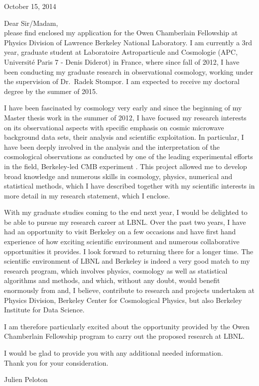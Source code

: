 \documentclass[11pt]{article}
\begin{document}
\thispagestyle{empty}
\thispagestyle{fancy}

\begin{flushright}
October 15, 2014
\end{flushright}

Dear Sir/Madam,
\\

please find enclosed my application for the Owen Chamberlain Fellowship at  Physics Division of Lawrence Berkeley National Laboratory. I am currently a 3rd year, graduate student  at Laboratoire Astroparticule and Cosmologie (APC, Universit\'e Paris 7 - Denis Diderot) in France, where since fall of 2012, I have been conducting my graduate research in observational cosmology, working under the supervision of Dr.~Radek Stompor. I am expected to receive my doctoral degree by the summer of 2015.

I have been fascinated by cosmology very early and since the beginning of my Master thesis work in the summer of 2012, I have focused my research interests on its observational aspects with specific emphasis on cosmic microwave background data sets, their analysis and scientific exploitation. In particular, I have been deeply involved in the analysis and the interpretation of the cosmological observations as conducted by one of the leading experimental efforts in the field, Berkeley-led CMB experiment {}. This project allowed me to develop broad knowledge and numerous skills in cosmology, physics, numerical and statistical methods, which I have described together with my scientific interests in more detail in my research statement, which I enclose.

With my graduate studies coming to the end next year, I would be delighted to be able to pursue my research career at LBNL. Over the past two years, I have had an opportunity to visit Berkeley
on a few occasions and have first hand experience of how exciting scientific environment and numerous collaborative opportunities it provides. I look forward to returning there for
a longer time. The scientific environment of LBNL and Berkeley is indeed a very good match to my research program, which involves physics, cosmology as well as statistical algorithms and methods, and which, without any doubt, would benefit enormously from and, I believe, contribute to research and projects undertaken at Physics Division, Berkeley Center for Cosmological Physics, but also Berkeley Institute for Data Science.

I am therefore particularly excited about the opportunity provided by the Owen Chamberlain Fellowship program to carry out the proposed research at LBNL.

I would be glad to provide you with any additional needed information.
\\

Thank you for your consideration.

\begin{flushright}
Julien Peloton
\end{flushright}
\end{document}
